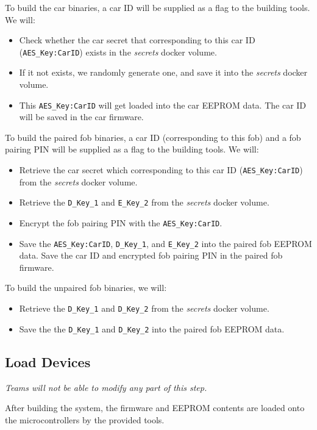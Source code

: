 \documentclass[11pt,oneside,onecolumn,letterpaper]{article}
\begin{document}
To build the car binaries, a car ID will be supplied as a flag to the building tools. We will:
\begin{itemize}
	\item Check whether the car secret that corresponding to this car ID (\verb|AES_Key:CarID|) exists in the \textit{secrets} docker volume.
	\item If it not exists, we randomly generate one, and save it into the \textit{secrets} docker volume.
	\item This \verb|AES_Key:CarID| will get loaded into the car EEPROM data. The car ID will be saved in the car firmware.
\end{itemize}

To build the paired fob binaries, a car ID (corresponding to this fob) and a fob pairing PIN will be supplied as a flag to the building tools. We will:
\begin{itemize}
	\item Retrieve the car secret which corresponding to this car ID (\verb|AES_Key:CarID|) from the \textit{secrets} docker volume.
	\item Retrieve the \verb|D_Key_1| and \verb|E_Key_2| from the \textit{secrets} docker volume.
	\item Encrypt the fob pairing PIN with the \verb|AES_Key:CarID|.
	\item Save the \verb|AES_Key:CarID|, \verb|D_Key_1|, and \verb|E_Key_2| into the paired fob EEPROM data. Save the car ID and encrypted fob pairing PIN in the paired fob firmware.
\end{itemize}

To build the unpaired fob binaries, we will:
\begin{itemize}
	\item Retrieve the \verb|D_Key_1| and \verb|D_Key_2| from the \textit{secrets} docker volume.
	\item Save the the \verb|D_Key_1| and \verb|D_Key_2| into the paired fob EEPROM data.
\end{itemize}

\subsection{Load Devices}

\textit{Teams will not be able to modify any part of this step.}

After building the system, the firmware and EEPROM contents are loaded onto the microcontrollers by the provided tools.
\end{document}
